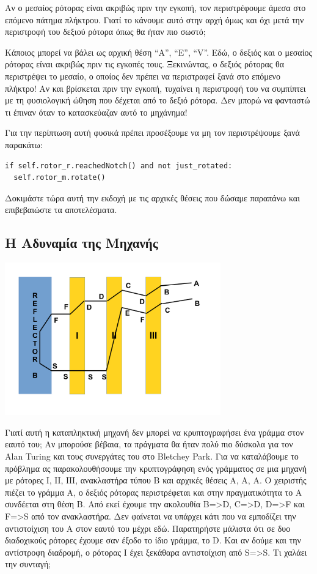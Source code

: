 \documentclass[a4paper,twoside,12pt]{article}
\begin{document}
Αν ο μεσαίος ρότορας είναι ακριβώς πριν την εγκοπή, τον περιστρέφουμε άμεσα στο επόμενο πάτημα πλήκτρου. Γιατί το κάνουμε αυτό στην αρχή όμως και όχι μετά την περιστροφή του δεξιού ρότορα όπως θα ήταν πιο σωστό;

Κάποιος μπορεί να βάλει ως αρχική θέση “A”, “E”, “V”. Εδώ, ο δεξιός και ο μεσαίος ρότορας είναι ακριβώς πριν τις εγκοπές τους. Ξεκινώντας, ο δεξιός ρότορας θα περιστρέψει το μεσαίο, ο οποίος δεν πρέπει να περιστραφεί ξανά στο επόμενο πλήκτρο! Αν και βρίσκεται πριν την εγκοπή, τυχαίνει η περιστροφή του να συμπίπτει με τη φυσιολογική ώθηση που δέχεται από το δεξιό ρότορα. Δεν μπορώ να φανταστώ τι έπιναν όταν το κατασκεύαζαν αυτό το μηχάνημα!

Για την περίπτωση αυτή φυσικά πρέπει προσέξουμε να μη τον περιστρέψουμε ξανά παρακάτω:

\begin{verbatim}
if self.rotor_r.reachedNotch() and not just_rotated:
  self.rotor_m.rotate()
\end{verbatim}

Δοκιμάστε τώρα αυτή την εκδοχή με τις αρχικές θέσεις που δώσαμε παραπάνω και επιβεβαιώστε τα αποτελέσματα. 

\subsection{Η Αδυναμία της Μηχανής}
%
\begin{center}
  \includegraphics[width=0.7\textwidth]{images/main/flaw}
\end{center}
%
Γιατί αυτή η καταπληκτική μηχανή δεν μπορεί να κρυπτογραφήσει ένα γράμμα στον εαυτό του; Αν μπορούσε βέβαια, τα πράγματα θα ήταν πολύ πιο δύσκολα για τον Alan Turing και τους συνεργάτες του στο Bletchey Park. Για να καταλάβουμε το πρόβλημα ας παρακολουθήσουμε την κρυπτογράφηση ενός γράμματος σε μια μηχανή με ρότορες Ι, ΙΙ, ΙΙΙ, ανακλαστήρα τύπου Β και αρχικές θέσεις Α, Α, Α. Ο χειριστής πιέζει το γράμμα Α, ο δεξιός ρότορας περιστρέφεται και στην πραγματικότητα το Α συνδέεται  στη θέση Β. Από εκεί έχουμε την ακολουθία B=>D, C=>D, D=>F και F=>S από τον ανακλαστήρα. Δεν φαίνεται να υπάρχει κάτι που να εμποδίζει την αντιστοίχιση του Α στον εαυτό του μέχρι εδώ. Παρατηρήστε μάλιστα ότι σε δυο διαδοχικούς ρότορες έχουμε σαν έξοδο το ίδιο γράμμα, το D. Και αν δούμε και την αντίστροφη διαδρομή, ο ρότορας Ι έχει ξεκάθαρα αντιστοίχιση από S=>S. Τι χαλάει την συνταγή;
\end{document}
